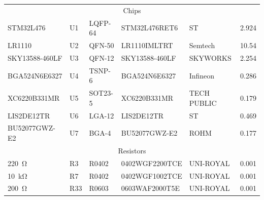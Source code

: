 \begin{appendices}
\begin{footnotesize}
\begin{longtable}{llllll}
    \multicolumn{6}{c}{\cellcolor[HTML]{EFEFEF}Chips} \\
    STM32L476 & U1 & LQFP-64 & STM32L476RET6 & ST & 2.924 \label{bom:stm32l476} \\
    LR1110 & U2 & QFN-50 & LR1110IMLTRT & Semtech & 10.54 \label{bom:lr1110}\\
    SKY13588-460LF & U3 & QFN-12 & SKY13588-460LF & SKYWORKS & 2.254 \\
    BGA524N6E6327 & U4 & TSNP-6 & BGA524N6E6327 & Infineon & 0.286 \label{bom:bga524n6e6327}\\
    XC6220B331MR & U5 & SOT23-5 & XC6220B331MR & TECH PUBLIC & 0.179 \label{bom:xc6220} \\
    LIS2DE12TR & U6 & LGA-12 & LIS2DE12TR & ST & 0.469 \label{bom:lis2de12}\\
    BU52077GWZ-E2 & U7 & BGA-4 & BU52077GWZ-E2 & ROHM & 0.177 \label{bom:bu52077gwz}\\

    \multicolumn{6}{c}{\cellcolor[HTML]{EFEFEF}Resistors} \\
    \SI{220}{\ohm} & R3 & R0402 & 0402WGF2200TCE & UNI-ROYAL & 0.001 \\
    \SI{10}{\kilo\ohm} & R7 & R0402 & 0402WGF1002TCE & UNI-ROYAL & 0.001 \\
    \SI{200}{\ohm} & R33 & R0603 & 0603WAF2000T5E & UNI-ROYAL & 0.001 \\


\end{longtable}
\end{footnotesize}
\end{appendices}
